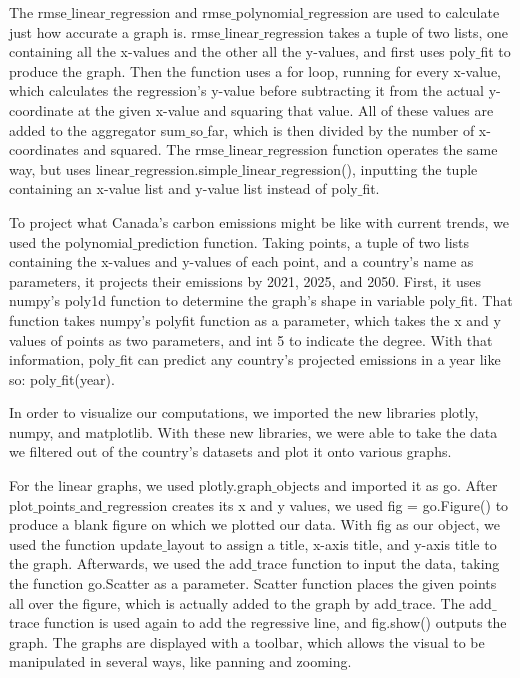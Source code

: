 \documentclass[fontsize=11pt]{article}
\begin{document}
    The rmse$\_$linear$\_$regression and rmse$\_$polynomial$\_$regression are used to calculate just how accurate a graph is. rmse$\_$linear$\_$regression takes a tuple of two lists, one containing all the x-values and the other all the y-values, and first uses poly$\_$fit to produce the graph. Then the function uses a for loop, running for every x-value, which calculates the regression's y-value before subtracting it from the actual y-coordinate at the given x-value and squaring that value. All of these values are added to the aggregator sum$\_$so$\_$far, which is then divided by the number of x-coordinates and squared. The rmse$\_$linear$\_$regression function operates the same way, but uses linear$\_$regression.simple$\_$linear$\_$regression(), inputting the tuple containing an x-value list and y-value list instead of poly$\_$fit.

    To project what Canada's carbon emissions might be like with current trends, we used the polynomial$\_$prediction function. Taking points, a tuple of two lists containing the x-values and y-values of each point, and a country's name as parameters, it projects their emissions by 2021, 2025, and 2050. First, it uses numpy's poly1d function to determine the graph's shape in variable poly$\_$fit. That function takes numpy's polyfit function as a parameter, which takes the x and y values of points as two parameters, and int 5 to indicate the degree. With that information, poly$\_$fit can predict any country's projected emissions in a year like so: poly$\_$fit(year).

    In order to visualize our computations, we imported the new libraries plotly, numpy, and matplotlib. With these new libraries, we were able to take the data we filtered out of the country's datasets and plot it onto various graphs.

    For the linear graphs, we used plotly.graph$\_$objects and imported it as go. After plot$\_$points$\_$and$\_$regression creates its x and y values, we used fig = go.Figure() to produce a blank figure on which we plotted our data. With fig as our object, we used the function update$\_$layout to assign a title, x-axis title, and y-axis title to the graph. Afterwards, we used the add$\_$trace function to input the data, taking the function go.Scatter as a parameter. Scatter function places the given points all over the figure, which is actually added to the graph by add$\_$trace. The add$\_$trace function is used again to add the regressive line, and fig.show() outputs the graph. The graphs are displayed with a toolbar, which allows the visual to be manipulated in several ways, like panning and zooming.
\end{document}
